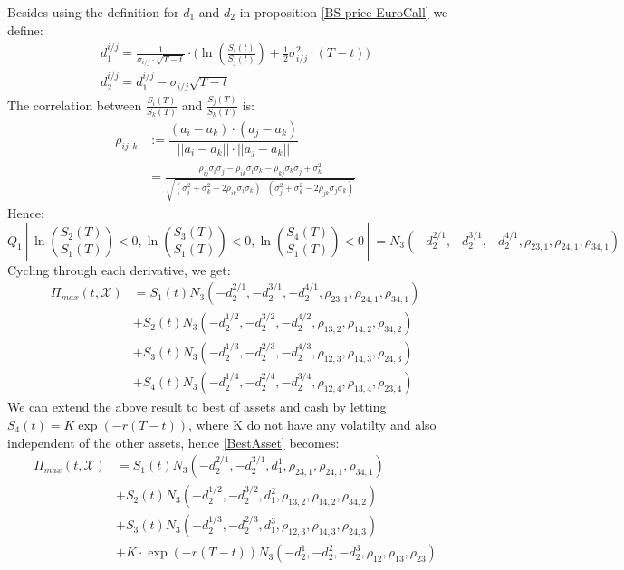 Besides using the definition for $d_1$ and $d_2$ in proposition \ref{BS-price-EuroCall} we define:
\begin{align}
d^{i/j}_1 =\frac{1}{\sigma_{i/j}\cdot \sqrt{T-t}} \cdot \bigg( \ln(\frac{S_i(t)}{S_j(t)}) + \frac{1}{2} \sigma_{i/j}^2 \cdot (T-t) \bigg)\\
d^{i/j}_2=d^{i/j}_1-\sigma_{i/j} \sqrt{T-t}
\end{align}
The correlation between $\frac{S_i(T)}{S_k(T)}$ and $\frac{S_j(T)}{S_k(T)}$ is:
\begin{align}
\rho_{ij,k}&:= \dfrac{(a_i-a_k)\cdot(a_j-a_k)}{||a_i-a_k|| \cdot ||a_j-a_k||}\\
&=\frac{\rho_{ij}\sigma_i \sigma_j - \rho_{ik}\sigma_i \sigma_k - \rho_{kj}\sigma_k \sigma_j + \sigma_k^2}{\sqrt{(\sigma_i^2 + \sigma_k^2 - 2\rho_{ik}\sigma_i \sigma_k)\cdot(\sigma_j^2 + \sigma_k^2 - 2\rho_{jk}\sigma_j \sigma_k)}}
\end{align}
Hence:
$$Q_1[\ln(\frac{S_2(T)}{S_1(T)})<0, \ln(\frac{S_3(T)}{S_1(T)})<0, \ln(\frac{S_4(T)}{S_1(T)})<0]=N_3(-d_2^{2/1},-d_2^{3/1},-d_2^{4/1}, \rho_{23,1}, \rho_{24,1}, \rho_{34,1})$$
Cycling through each derivative, we get:
\begin{equation}\label{BestAsset}
\begin{split}
\Pi_{max}(t,\mathcal{X})&=S_1(t) N_3(-d_2^{2/1},-d_2^{3/1},-d_2^{4/1}, \rho_{23,1}, \rho_{24,1}, \rho_{34,1}) \\
&+S_2(t) N_3(-d_2^{1/2},-d_2^{3/2},-d_2^{4/2}, \rho_{13,2}, \rho_{14,2}, \rho_{34,2})\\
&+S_3(t) N_3(-d_2^{1/3},-d_2^{2/3},-d_2^{4/3}, \rho_{12,3}, \rho_{14,3}, \rho_{24,3}) \\
&+S_4(t) N_3(-d_2^{1/4},-d_2^{2/4},-d_2^{3/4}, \rho_{12,4}, \rho_{13,4}, \rho_{23,4})
\end{split}
\end{equation}
We can extend the above result to best of assets and cash by letting $S_4(t)=K\exp(-r(T-t))$, where K do not have any volatilty and also independent of the other assets, hence \eqref{BestAsset} becomes:
\begin{equation}\label{BestAssetOrCash}
\begin{split}
\Pi_{max}(t,\mathcal{X})&=S_1(t) N_3(-d_2^{2/1},-d_2^{3/1},d_1^{1}, \rho_{23,1}, \rho_{24,1}, \rho_{34,1}) \\
&+S_2(t) N_3(-d_2^{1/2},-d_2^{3/2},d_1^{2}, \rho_{13,2}, \rho_{14,2}, \rho_{34,2})\\
&+S_3(t) N_3(-d_2^{1/3},-d_2^{2/3},d_1^{3}, \rho_{12,3}, \rho_{14,3}, \rho_{24,3}) \\
&+K\cdot \exp(-r(T-t)) N_3(-d_2^1,-d_2^2,-d_2^3, \rho_{12}, \rho_{13}, \rho_{23})
\end{split}
\end{equation}

